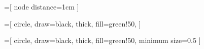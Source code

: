 
  
\usetikzlibrary{positioning}
\usetikzlibrary{shapes.geometric}
\usetikzlibrary{arrows}
\usetikzlibrary{arrows.meta}
\usetikzlibrary{fit}
\usetikzlibrary{calc}
\usetikzlibrary{matrix}

=[
	node distance=1cm
]


=[
	circle, 
	draw=black,
	thick,
	fill=green!50,
]

=[
circle, 
draw=black,
thick,
fill=green!50,
minimum size=0.5
]
